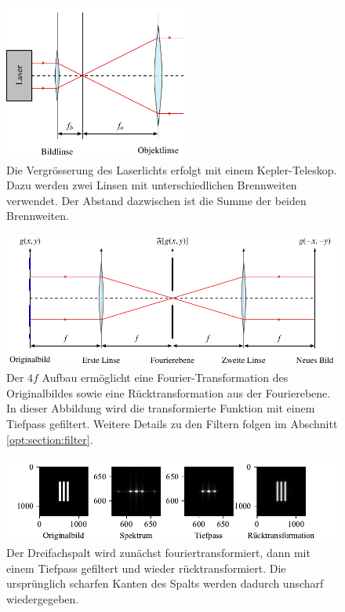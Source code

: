 \begin{figure}
    \centering
    \includegraphics[width=60mm]{papers/opt/images/laserAufweiten.pdf}
    \caption{Die Vergrösserung des Laserlichts erfolgt mit einem Kepler-Teleskop.
        Dazu werden zwei Linsen mit unterschiedlichen Brennweiten verwendet.
        Der Abstand dazwischen ist die Summe der beiden Brennweiten.}
    \label{opt:fig:laserAufweiten}
\end{figure}

\begin{figure}
    \centering
    \includegraphics[width=\textwidth]{papers/opt/images/4fAufbau.pdf}
    \caption{Der $4f$ Aufbau ermöglicht eine Fourier-Transformation des Originalbildes sowie eine Rücktransformation aus der Fourierebene.
    In dieser Abbildung wird die transformierte Funktion mit einem Tiefpass gefiltert.
    Weitere Details zu den Filtern folgen im Abschnitt \ref{opt:section:filter}.}
    \label{opt:fig:4fAufbau}
\end{figure}

\begin{figure}
    \centering
    \includegraphics[width=\textwidth]{papers/opt/images/dreifachspalt_tiefpass.pdf}
    \caption{Der Dreifachspalt wird zunächst fouriertransformiert, dann mit einem Tiefpass gefiltert und wieder rücktransformiert.
    Die ursprünglich scharfen Kanten des Spalts werden dadurch unscharf wiedergegeben.}
    \label{opt:fig:three_slit_simulation}
\end{figure}

